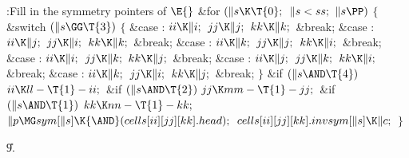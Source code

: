 \B{}:Fill in the symmetry pointers of \X${}%
\E{}$\6
\&{for} ${}(\|s\K\T{0};{}$ ${}\|s<\\{ss};{}$ ${}\|s\PP){}$\5
${}\{{}$\1\6
\&{switch} ${}(\|s\GG\T{3}){}$\5
${}\{{}$\1\6
\4\&{case} :\5
${}\\{ii}\K\|i;{}$\6
${}\\{jj}\K\|j;{}$\6
${}\\{kk}\K\|k;{}$\6
\&{break};\6
\4\&{case} :\5
${}\\{ii}\K\|j;{}$\6
${}\\{jj}\K\|i;{}$\6
${}\\{kk}\K\|k;{}$\6
\&{break};\6
\4\&{case} :\5
${}\\{ii}\K\|k;{}$\6
${}\\{jj}\K\|j;{}$\6
${}\\{kk}\K\|i;{}$\6
\&{break};\6
\4\&{case} :\5
${}\\{ii}\K\|i;{}$\6
${}\\{jj}\K\|k;{}$\6
${}\\{kk}\K\|j;{}$\6
\&{break};\6
\4\&{case} :\5
${}\\{ii}\K\|j;{}$\6
${}\\{jj}\K\|k;{}$\6
${}\\{kk}\K\|i;{}$\6
\&{break};\6
\4\&{case} :\5
${}\\{ii}\K\|k;{}$\6
${}\\{jj}\K\|i;{}$\6
${}\\{kk}\K\|j;{}$\6
\&{break};\6
\4${}\}{}$\2\6
\&{if} ${}(\|s\AND\T{4}){}$\1\5
${}\\{ii}\K\\{ll}-\T{1}-\\{ii};{}$\2\6
\&{if} ${}(\|s\AND\T{2}){}$\1\5
${}\\{jj}\K\\{mm}-\T{1}-\\{jj};{}$\2\6
\&{if} ${}(\|s\AND\T{1}){}$\1\5
${}\\{kk}\K\\{nn}-\T{1}-\\{kk};{}$\2\6
${}\|p\MG\\{sym}[\|s]\K{\AND}(\\{cells}[\\{ii}][\\{jj}][\\{kk}].\\{head});{}$\6
${}\\{cells}[\\{ii}][\\{jj}][\\{kk}].\\{invsym}[\|s]\K\|c;{}$\6
\4${}\}{}$\2\par
\U9.\fi

